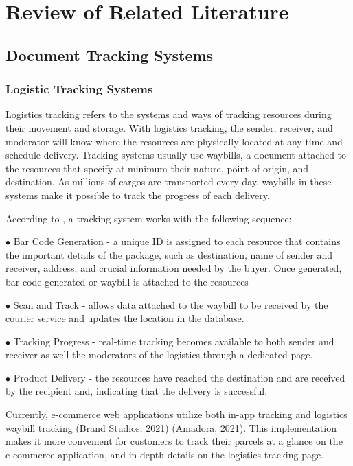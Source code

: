 \chapter{Review of Related Literature}
\label{sec:relatedlit}

\section{Document Tracking Systems}

\subsection{Logistic Tracking Systems}
Logistics tracking refers to the systems and ways of tracking resources during their movement and storage. With logistics tracking, the sender, receiver, and moderator will know where the resources are physically located at any time and schedule delivery. Tracking systems usually use waybills, a document attached to the resources that specify at minimum their nature, point of origin, and destination.\cite{waybill} As millions of cargos are transported every day, waybills in these systems make it possible to track the progress of each delivery. 

According to , a tracking system works with the following sequence:
\begin{description}
   \item $\bullet$ Bar Code Generation - a unique ID is assigned to each resource that contains the important details of the package, such as destination, name of sender and receiver, address, and crucial information needed by the buyer. Once generated, bar code generated or waybill is attached to the resources
   \item $\bullet$ Scan and Track - allows data attached to the waybill to be received by the courier service and updates the location in the database.
   \item $\bullet$ Tracking Progress - real-time tracking becomes available to both sender and receiver as well the moderators of the logistics through a dedicated page.
   \item $\bullet$ Product Delivery - the resources have reached the destination and are received by the recipient and, indicating that the delivery is successful.
\end{description}

Currently, e-commerce web applications utilize both in-app tracking and logistics waybill tracking (Brand Studios, 2021) (Amadora, 2021). This implementation makes it more convenient for customers to track their parcels at a glance on the e-commerce application, and in-depth details on the logistics tracking page. 

